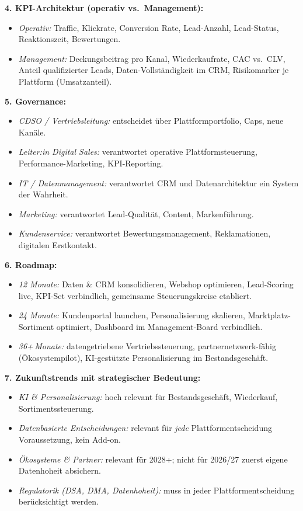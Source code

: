 \documentclass[11pt,a4paper,oneside]{article}
\begin{document}
\begin{loesungbox}
\textbf{4. KPI-Architektur (operativ vs.\ Management):}
\begin{itemize}
  \item \emph{Operativ:} Traffic, Klickrate, Conversion Rate, Lead-Anzahl, Lead-Status, Reaktionszeit, Bewertungen.
  \item \emph{Management:} Deckungsbeitrag pro Kanal, Wiederkaufrate, CAC vs.\ CLV, Anteil qualifizierter Leads, Daten-Vollständigkeit im CRM, Risikomarker je Plattform (Umsatzanteil).
\end{itemize}

\textbf{5. Governance:}
\begin{itemize}
  \item \emph{CDSO / Vertriebsleitung:} entscheidet über Plattformportfolio, Caps, neue Kanäle.
  \item \emph{Leiter:in Digital Sales:} verantwortet operative Plattformsteuerung, Performance-Marketing, KPI-Reporting.
  \item \emph{IT / Datenmanagement:} verantwortet CRM und Datenarchitektur \textendash{} ein System der Wahrheit.
  \item \emph{Marketing:} verantwortet Lead-Qualität, Content, Markenführung.
  \item \emph{Kundenservice:} verantwortet Bewertungsmanagement, Reklamationen, digitalen Erstkontakt.
\end{itemize}

\textbf{6. Roadmap:}
\begin{itemize}
  \item \emph{12 Monate:} Daten \& CRM konsolidieren, Webshop optimieren, Lead-Scoring live, KPI-Set verbindlich, gemeinsame Steuerungskreise etabliert.
  \item \emph{24 Monate:} Kundenportal launchen, Personalisierung skalieren, Marktplatz-Sortiment optimiert, Dashboard im Management-Board verbindlich.
  \item \emph{36+\,Monate:} datengetriebene Vertriebssteuerung, partnernetzwerk-fähig (Ökosystempilot), KI-gestützte Personalisierung im Bestandsgeschäft.
\end{itemize}

\textbf{7. Zukunftstrends mit strategischer Bedeutung:}
\begin{itemize}
  \item \emph{KI \& Personalisierung:} hoch relevant für Bestandsgeschäft, Wiederkauf, Sortimentssteuerung.
  \item \emph{Datenbasierte Entscheidungen:} relevant für \emph{jede} Plattformentscheidung \textendash{} Voraussetzung, kein Add-on.
  \item \emph{Ökosysteme \& Partner:} relevant für 2028+; nicht für 2026/27 \textendash{} zuerst eigene Datenhoheit absichern.
  \item \emph{Regulatorik (DSA, DMA, Datenhoheit):} muss in jeder Plattformentscheidung berücksichtigt werden.
\end{itemize}


\end{loesungbox}
\end{document}
